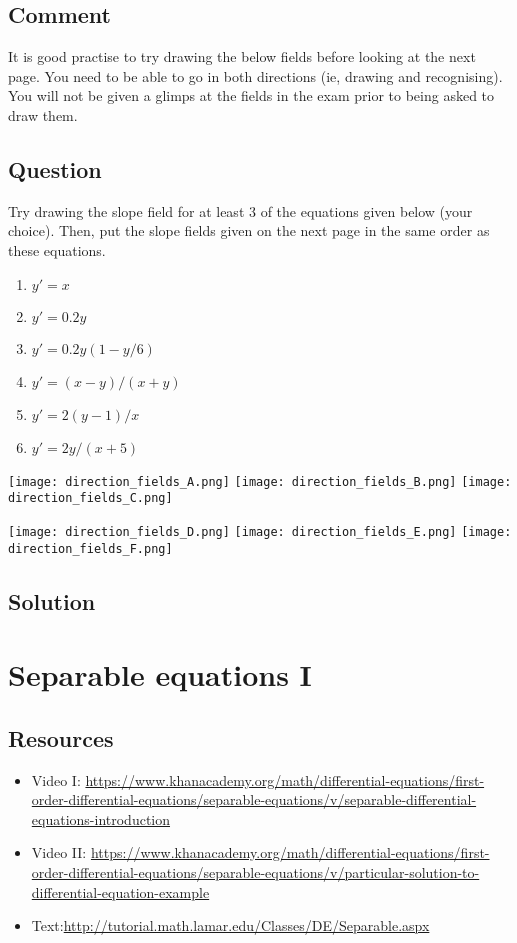 \subsection*{Comment}
It is good practise to try drawing the below fields before looking at the next page. You need to be able to go in both directions (ie, drawing and recognising). You will not be given a glimps at the fields in the exam prior to being asked to draw them.

\subsection*{Question}
Try drawing the slope field for at least 3 of the equations given below (your choice). Then, put the slope fields given on the next page in the same order as these equations.

\begin{enumerate}
    \item $y'=x$
    \item $y'=0.2y$
    \item $y'=0.2y(1-y/6)$
    \item $y'=(x-y)/(x+y)$
    \item $y'=2(y-1)/x$
    \item $y'=2y/(x+5)$
\end{enumerate}

\newpage

\texttt{[image: direction\_fields\_A.png]}
\texttt{[image: direction\_fields\_B.png]}
\texttt{[image: direction\_fields\_C.png]}

\texttt{[image: direction\_fields\_D.png]}
\texttt{[image: direction\_fields\_E.png]}
\texttt{[image: direction\_fields\_F.png]}

\subsection*{Solution}




\newpage
\section{Separable equations I}
\label{sec:sepy}

\subsection*{Resources}
\begin{itemize}
    \item Video I: \url{https://www.khanacademy.org/math/differential-equations/first-order-differential-equations/separable-equations/v/separable-differential-equations-introduction} 
    \item Video II: \url{https://www.khanacademy.org/math/differential-equations/first-order-differential-equations/separable-equations/v/particular-solution-to-differential-equation-example}
    \item Text:\url{http://tutorial.math.lamar.edu/Classes/DE/Separable.aspx}
\end{itemize}

